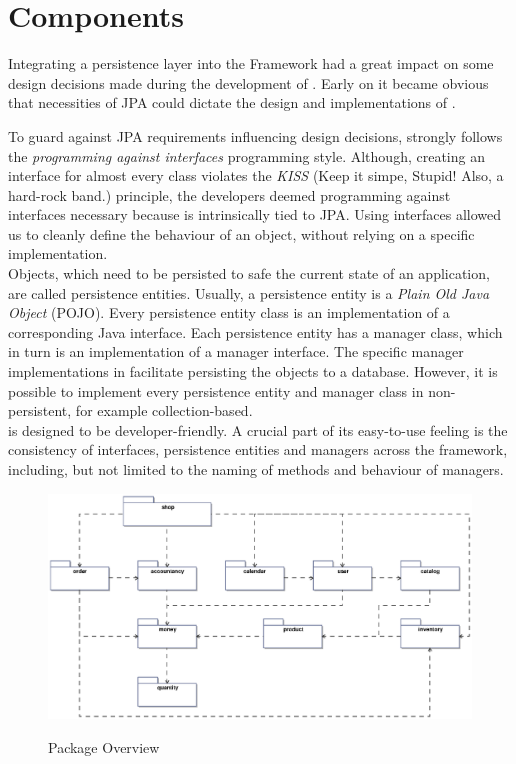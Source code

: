 \newpage
\chapter{\salespoint{} Components}
\label{chap:components}
Integrating a persistence layer into the \salespoint{} Framework had a great impact on some design decisions made during the development of \salespoint{}.
Early on it became obvious that necessities of JPA could dictate the design and implementations of \salespoint{}.

To guard against JPA requirements influencing design decisions, \salespoint{} strongly follows the \textit{programming against interfaces} programming style.
Although, creating an interface for almost every class violates the \textit{KISS} (Keep it simpe, Stupid! Also, a hard-rock band.) principle, the developers deemed programming against interfaces necessary because \salespoint{} is intrinsically tied to JPA.
Using interfaces allowed us to cleanly define the behaviour of an object, without relying on a specific implementation.
\\

Objects, which need to be persisted to safe the current state of an application, are called persistence entities.
Usually, a persistence entity is a \textit{Plain Old Java Object} (POJO).
Every persistence entity class is an implementation of a corresponding Java interface.
Each persistence entity has a manager class, which in turn is an implementation of a manager interface.
The specific manager implementations in \salespoint{} facilitate persisting the objects to a database.
However, it is possible to implement every persistence entity and manager class in \salespoint{} non-persistent, for example collection-based.
\\

\salespoint{} is designed to be developer-friendly.
A crucial part of its easy-to-use feeling is the consistency of interfaces, persistence entities and managers across the framework, including, but not limited to the naming of methods and behaviour of managers.
\\

\begin{figure}
	\centering
  \includegraphics[width=1.0\textwidth]{images/Package_Overview.eps}
	\label{package_overview}
	\caption{Package Overview}
\end{figure}

